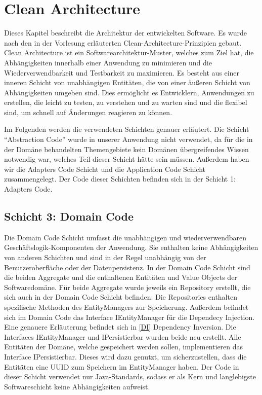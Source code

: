 \chapter{Clean Architecture}

Dieses Kapitel beschreibt die Architektur der entwickelten Software. Es wurde nach den in der Vorlesung erläuterten Clean-Architecture-Prinzipien gebaut. Clean Architecture ist ein Softwarearchitektur-Muster, welches zum Ziel hat, die Abhängigkeiten innerhalb einer Anwendung zu minimieren und die Wiederverwendbarkeit und Testbarkeit zu maximieren. Es besteht aus einer inneren Schicht von unabhängigen Entitäten, die von einer äußeren Schicht von Abhängigkeiten umgeben sind. Dies ermöglicht es Entwicklern, Anwendungen zu erstellen, die leicht zu testen, zu verstehen und zu warten sind und die flexibel sind, um schnell auf Änderungen reagieren zu können.

Im Folgenden werden die verwendeten Schichten genauer erläutert. Die Schicht \enquote{Abstraction Code} wurde in unserer Anwendung nicht verwendet, da für die in der Domäne behandelten Themengebiete kein Domänen übergreifendes Wissen notwendig war, welches Teil dieser Schicht hätte sein müssen. 
Außerdem haben wir die Adapters Code Schicht und die Application Code Schicht zusammengelegt. Der Code dieser Schichten befinden sich in der Schicht 1: Adapters Code.

\section{Schicht 3: Domain Code}
Die Domain Code Schicht umfasst die unabhängigen und wiederverwendbaren Geschäftslogik-Komponenten der Anwendung. Sie enthalten keine Abhängigkeiten von anderen Schichten und sind in der Regel unabhängig von der Benutzeroberfläche oder der Datenpersistenz.
In der Domain Code Schicht sind die beiden Aggregate und die enthaltenen Entitäten und Value Objects der Softwaredomäne. Für beide Aggregate wurde jeweils ein Repository erstellt, die sich auch in der Domain Code Schicht befinden. Die Repositories enthalten spezifische Methoden des EntityManagers zur Speicherung. Außerdem befindet sich im Domain Code das Interface IEntityManager für die Dependecy Injection. Eine genauere Erläuterung befindet sich in \autoref{DI} Dependency Inversion. Die Interfaces IEntityManager und IPersistierbar wurden beide neu erstellt. Alle Entitäten der Domäne, welche gespeichert werden sollen, implementieren das Interface IPersistierbar. Dieses wird dazu genutzt, um sicherzustellen, dass die Entitäten eine UUID zum Speichern im EntityManager haben.
Der Code in dieser Schicht verwendet nur Java-Standards, sodass er als Kern und langlebigste Softwareschicht keine Abhängigkeiten aufweist.

